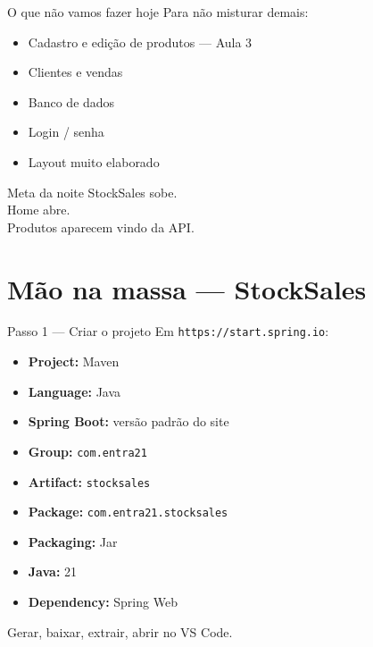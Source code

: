 \documentclass[aspectratio=169,11pt]{beamer}
\begin{document}
\begin{frame}{O que não vamos fazer hoje}
  Para não misturar demais:

  \vspace{0.5em}
  \begin{itemize}
    \item Cadastro e edição de produtos --- Aula 3
    \item Clientes e vendas
    \item Banco de dados
    \item Login / senha
    \item Layout muito elaborado
  \end{itemize}

  \vspace{0.6em}
  \begin{block}{Meta da noite}
    StockSales sobe.\\
    Home abre.\\
    Produtos aparecem vindo da API.
  \end{block}
\end{frame}

\section{Mão na massa --- StockSales}

\begin{frame}{Passo 1 --- Criar o projeto}
  Em \texttt{https://start.spring.io}:

  \vspace{0.4em}
  \begin{itemize}
    \item \textbf{Project:} Maven
    \item \textbf{Language:} Java
    \item \textbf{Spring Boot:} versão padrão do site
    \item \textbf{Group:} \texttt{com.entra21}
    \item \textbf{Artifact:} \texttt{stocksales}
    \item \textbf{Package:} \texttt{com.entra21.stocksales}
    \item \textbf{Packaging:} Jar
    \item \textbf{Java:} 21
    \item \textbf{Dependency:} Spring Web
  \end{itemize}

  Gerar, baixar, extrair, abrir no VS Code.
\end{frame}
\end{document}
